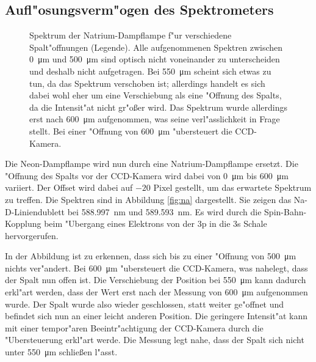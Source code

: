 \subsection{Aufl"osungsverm"ogen des Spektrometers}
\begin{figure}[htbp]
    \centering
    
    \caption{
        Spektrum der Natrium-Dampflampe f"ur verschiedene Spalt"offnungen (Legende).
        Alle aufgenommenen Spektren zwischen \SI{0}{\micro\metre} und \SI{500}{\micro\metre} sind optisch nicht voneinander zu unterscheiden und deshalb nicht aufgetragen.
        Bei \SI{550}{\micro\metre} scheint sich etwas zu tun, da das Spektrum verschoben ist; allerdings handelt es sich dabei wohl eher um eine Verschiebung als eine "Offnung des Spalts, da die Intensit"at nicht gr"o\ss er wird.
        Das Spektrum wurde allerdings erst nach \SI{600}{\micro\metre} aufgenommen, was seine verl"asslichkeit in Frage stellt.
        Bei einer "Offnung von \SI{600}{\micro\metre} "ubersteuert die CCD-Kamera.
    }
    \label{fig:na}
\end{figure}
Die Neon-Dampflampe wird nun durch eine Natrium-Dampflampe ersetzt.
Die "Offnung des Spalts vor der CCD-Kamera wird dabei von \SI{0}{\micro\metre} bis \SI{600}{\micro\metre} variiert.
Der Offset wird dabei auf $-20$ Pixel gestellt, um das erwartete Spektrum zu treffen.
Die Spektren sind in Abbildung \vref{fig:na} dargestellt.
Sie zeigen das Na-D-Liniendublett bei \SI{588,997}{nm} und \SI{589,593}{nm}.
Es wird durch die Spin-Bahn-Kopplung beim "Ubergang eines Elektrons von der 3p in die 3s Schale hervorgerufen.
\cite{NaD}

In der Abbildung ist zu erkennen, dass sich bis zu einer "Offnung von \SI{500}{\micro\metre} nichts ver"andert.
Bei \SI{600}{\micro\metre} "ubersteuert die CCD-Kamera, was nahelegt, dass der Spalt nun offen ist.
Die Verschiebung der Position bei \SI{550}{\micro\metre} kann dadurch erkl"art werden, dass der Wert erst nach der Messung von \SI{600}{\micro\metre} aufgenommen wurde.
Der Spalt wurde also wieder geschlossen, statt weiter ge"offnet und befindet sich nun an einer leicht anderen Position.
Die geringere Intensit"at kann mit einer tempor"aren Beeintr"achtigung der CCD-Kamera durch die "Ubersteuerung erkl"art werde.
Die Messung legt nahe, dass der Spalt sich nicht unter \SI{550}{\micro\metre} schlie{\ss}en l"asst.

